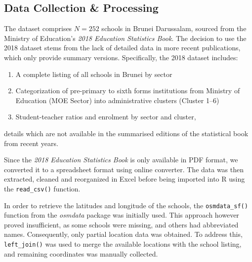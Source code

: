 \documentclass[12pt]{article}
\begin{document}
\subsection{Data Collection \& Processing}
\label{subsec: data collection}
The dataset comprises \( N = 252 \) schools in Brunei Darussalam, sourced from the Ministry of Education’s \textit{2018 Education Statistics Book}. The decision to use the 2018 dataset stems from the lack of detailed data in more recent publications, which only provide summary versions. Specifically, the 2018 dataset includes:

\begin{enumerate}
    \item A complete listing of all schools in Brunei by sector
    \item Categorization of pre-primary to sixth forms institutions from Ministry of Education (MOE Sector) into administrative clusters (Cluster 1–6)
    \item Student-teacher ratios and enrolment by sector and cluster,
\end{enumerate}

details which are not available in the summarised editions of the statistical book from recent years.

Since the \textit{2018 Education Statistics Book} is only available in PDF format, we converted it to a spreadsheet format using online converter. The data was then extracted, cleaned and reorganized in Excel before being imported into R using the \texttt{read\_csv()} function.

In order to retrieve the latitudes and longitude of the schools, the \texttt{osmdata\_sf()} function from the \textit{osmdata} package was initially used. This approach however proved insufficient, as some schools were missing, and others had abbreviated names. Consequently, only partial location data was obtained. To address this, \texttt{left\_join()} was used to merge the available locations with the school listing, and remaining coordinates was manually collected.
\end{document}
